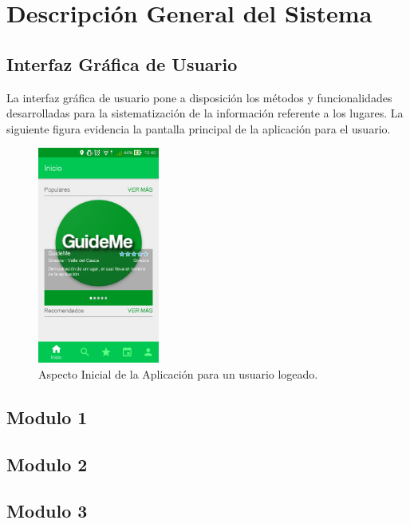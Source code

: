 \documentclass[12pt,letterpaper,openany]{book}
\begin{document}
\section{Descripción General del Sistema}
\subsection{Interfaz Gráfica de Usuario}
La interfaz gráfica de usuario pone a disposición los métodos y funcionalidades desarrolladas para la sistematización de la información referente a los lugares. La siguiente figura evidencia la pantalla principal de la aplicación para el usuario.

\begin{figure}[H]
\begin{center}
\includegraphics[width=4cm]{./imagenes/gui}
\caption{Aspecto Inicial de la Aplicación para un usuario logeado.}
\end{center}
\end{figure}

\subsection{Modulo 1}
\subsection{Modulo 2}
\subsection{Modulo 3}
\end{document}
